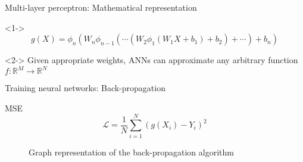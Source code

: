 \begin{frame}{Multi-layer perceptron: Mathematical representation}
    \begin{definition}<1->
        \begin{equation*}
            g(X) = \phi_n(W_n \phi_{n - 1}(\cdots (W_2 \phi_1(W_1 X + b_1) + b_2) + \cdots) + b_n)
        \end{equation*}
    \end{definition}

    \begin{theorem}<2->
        Given appropriate weights, \glspl{ANN} can approximate any arbitrary function $f: \mathbb{R}^M \to \mathbb{R}^N$ \cite{cybenkotApproximationSuperpositionsSigmoidal, hornikApproximationCapabilitiesMultilayer1991, hornikMultilayerFeedforwardNetworks1989}
    \end{theorem}
\end{frame}

\begin{frame}[fragile]{Training neural networks: Back-propagation}
    \begin{block}{\gls{MSE}}
        \begin{equation*}
            \mathcal{L} = \frac{1}{N} \sum_{i=1}^N (g(X_i) - Y_i)^2
        \end{equation*}
    \end{block}
    \begin{figure}[h]
        \centering
        \caption{Graph representation of the back-propagation algorithm}
        \label{fig:multi-layer-perceptron-backpropagation}
    \end{figure}
\end{frame}

